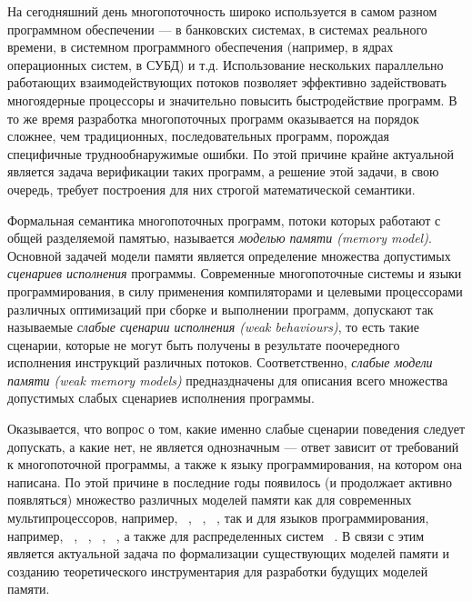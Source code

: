 
{\actuality} 
На сегодняшний день многопоточность широко используется в самом разном программном обеспечении --- в  банковских системах, в системах реального времени, в   системном программного обеспечения (например, в ядрах операционных систем, в СУБД) и т.д. Использование  нескольких параллельно работающих взаимодействующих потоков позволяет эффективно задействовать многоядерные процессоры и значительно повысить быстродействие программ. В то же время разработка  многопоточных программ оказывается на порядок 
сложнее, чем традиционных, последовательных программ, порождая специфичные  труднообнаружимые ошибки. 
По этой причине крайне актуальной является задача 
верификации таких  программ, а
решение этой задачи, в свою очередь, требует построения  для них 
строгой математической  семантики.

Формальная семантика многопоточных программ, потоки которых работают 
с общей разделяемой памятью, называется \emph{моделью памяти (memory model)}. 
Основной задачей модели памяти является определение множества 
допустимых \emph{сценариев исполнения} программы.
Современные многопоточные системы и языки программирования, в силу 
применения компиляторами и целевыми процессорами
различных оптимизаций при сборке и выполнении программ,
допускают так называемые \emph{слабые сценарии исполнения (weak behaviours)},
то есть такие сценарии, которые не могут быть получены в результате 
 поочередного исполнения инструкций различных потоков. Соответственно, 
\emph{слабые модели памяти (weak memory models)} предназдначены для описания всего множества 
допустимых слабых сценариев исполнения программы. 


Оказывается, что вопрос о том, какие именно слабые сценарии поведения 
следует допускать, а какие нет, не является однозначным --- ответ  
зависит от требований к многопоточной программы, а также к 
языку программирования, на котором она написана. 
По этой причине в последние годы появилось (и продолжает активно появляться) 
множество различных моделей памяти как для современных мультипроцессоров, например, \Intel~\autocite{Sewell-al:CACM10}, 
\ARM~\autocite{Pulte-al:POPL18}, 
\POWER~\autocite{Sarkar-al:PLDI11}, так и для языков программирования, например, 
\CPP~\autocite{Batty-al:POPL11},
\Java~\autocite{Manson-al:POPL05}, 
\JS~\autocite{Watt-al:PLDI2020}, 
\OCaml~\autocite{Dolan-al:PLDI18},
а также для распределенных систем%
~\autocite{Jagadeesan-al:ESOP2018,Lahav-Boker:PLDI2020}.
В связи с этим является актуальной задача по формализации 
существующих моделей памяти и созданию теоретического инструментария
для разработки будущих моделей памяти.



